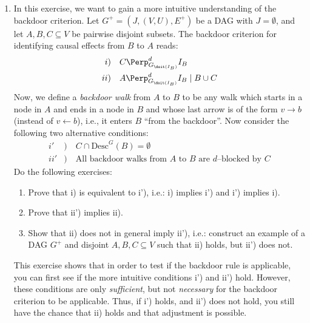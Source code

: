 \begin{enumerate}[label=8.\arabic*]
    \item %
    In this exercise, we want to gain a more intuitive understanding of the backdoor criterion.
    Let $G^{+} = (J, (V, U), E^{+})$ be a DAG with $J = \emptyset$, and let $A, B, C \subseteq V$ be pairwise disjoint subsets.
    The backdoor criterion for identifying causal effects from $B$ to $A$ reads:
    \begin{align*}
        i  & )  \quad   C    \Perp^d_{G_{\doit(I_B)}} I_B                \\
        ii & )  \quad    A    \Perp^d_{G_{\doit(I_B)}} I_B \mid B \cup C
    \end{align*}
    Now, we define a \emph{backdoor walk} from $A$ to $B$ to be any walk which starts in a node in $A$ and ends in a node in $B$ and whose last arrow is of the form $v \rightarrow b$ (instead of $v \leftarrow b$), i.e., it enters $B$ ``from the backdoor''.
    Now consider the following two alternative conditions:
    \begin{align*}
        i'  & ) \quad   C \cap \text{Desc}^G(B) = \emptyset                               \\
        ii' & ) \quad   \text{All backdoor walks from $A$ to $B$ are $d$--blocked by $C$}
    \end{align*}
    Do the following exercises:
    \begin{enumerate}
        \item Prove that i) is equivalent to i'), i.e.: i) implies i') and i') implies i).
        \item Prove that ii') implies ii).
        \item Show that ii) does not in general imply ii'), i.e.: construct an example of a DAG $G^+$ and disjoint $A, B, C \subseteq V$ such that ii) holds, but ii') does not.
    \end{enumerate}
    This exercise shows that in order to test if the backdoor rule is applicable, you can first see if the more intuitive conditions i') and ii') hold.
    However, these conditions are only \emph{sufficient}, but not \emph{necessary} for the backdoor criterion to be applicable.
    Thus, if i') holds, and ii') does not hold, you still have the chance that ii) holds and that adjustment is possible.



\end{enumerate}

